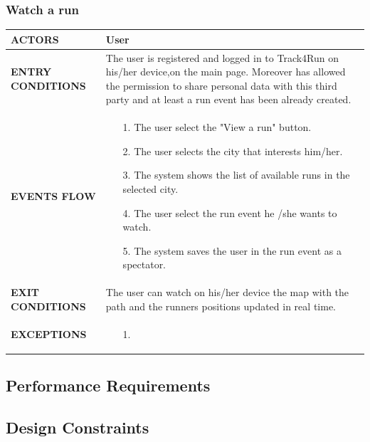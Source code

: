 \documentclass[a4paper]{article}
\begin{document}
\subsubsection{Watch a run}
\begin{center}
    \begin{tabular}{l || p{8cm} ||}
        \bf{ACTORS} & User \\ \hline
        \bf{ENTRY CONDITIONS} & The user is registered and logged in to Track4Run on his/her device,on the main page. Moreover has allowed the permission to share personal data with this third party and at least a run event has been already created. \\ \hline
        \bf{EVENTS FLOW} & \begin{itemize}[noitemsep, topsep=0cm, leftmargin=*] \vspace{-0.2cm}
            \item[1.] The user select the "View a run" button.
            \item[2.] The user selects the city that interests him/her. 
            \item[3.] The system shows the list of available runs in the selected city.
            \item[4.] The user select the run event he /she wants to watch.
            \item[5.] The system saves the user in the run event as a spectator.
        \end{itemize}
        \\ \hline
        \bf{EXIT CONDITIONS} & The user can watch on his/her device the map with the path and the runners positions updated in real time. \\ \hline
        \bf{EXCEPTIONS} & \begin{itemize}[noitemsep, topsep=0cm, leftmargin=*] \vspace{-0.2cm}
            \item[1.] 
        \end{itemize}
        \\ \hline \hline
    \end{tabular}
\end{center}
    
    \subsection{Performance Requirements}
    
    \subsection{Design Constraints}
    
\end{document}
